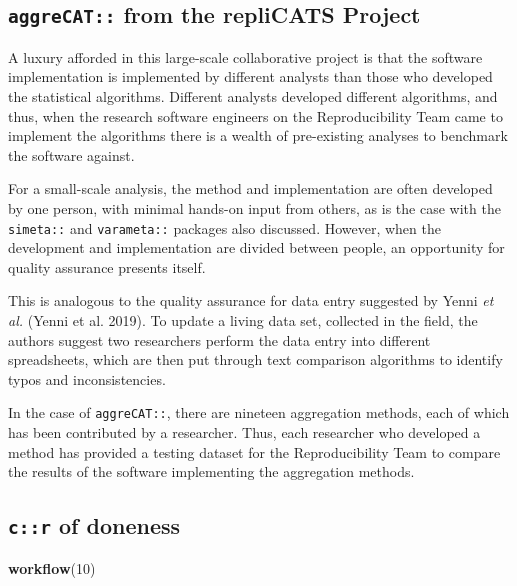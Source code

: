 \documentclass[
]{article}
\newenvironment{Shaded}{\begin{snugshade}}{\end{snugshade}}
\newcommand{\DecValTok}[1]{\textcolor[rgb]{0.00,0.00,0.81}{#1}}
\newcommand{\KeywordTok}[1]{\textcolor[rgb]{0.13,0.29,0.53}{\textbf{#1}}}
\newcommand{\NormalTok}[1]{#1}
\begin{document}
\hypertarget{aggrecat-from-the-replicats-project}{%
\subsection{\texorpdfstring{\texttt{aggreCAT::} from the repliCATS Project}{aggreCAT:: from the repliCATS Project}}\label{aggrecat-from-the-replicats-project}}

A luxury afforded in this large-scale collaborative project is that the software implementation is implemented by different analysts than those who developed the statistical algorithms. Different analysts developed different algorithms, and thus, when the research software engineers on the Reproducibility Team came to implement the algorithms there is a wealth of pre-existing analyses to benchmark the software against.

For a small-scale analysis, the method and implementation are often developed by one person, with minimal hands-on input from others, as is the case with the \texttt{simeta::} and \texttt{varameta::} packages also discussed. However, when the development and implementation are divided between people, an opportunity for quality assurance presents itself.

This is analogous to the quality assurance for data entry suggested by Yenni \emph{et al.} (Yenni et al. 2019). To update a living data set, collected in the field, the authors suggest two researchers perform the data entry into different spreadsheets, which are then put through text comparison algorithms to identify typos and inconsistencies.

In the case of \texttt{aggreCAT::}, there are nineteen aggregation methods, each of which has been contributed by a researcher. Thus, each researcher who developed a method has provided a testing dataset for the Reproducibility Team to compare the results of the software implementing the aggregation methods.

\hypertarget{cr-of-doneness}{%
\subsection{\texorpdfstring{\texttt{c::r} of doneness}{c::r of doneness}}\label{cr-of-doneness}}

\begin{Shaded}
\begin{Highlighting}[]
\KeywordTok{workflow}\NormalTok{(}\DecValTok{10}\NormalTok{)}
\end{Highlighting}
\end{Shaded}
\end{document}
